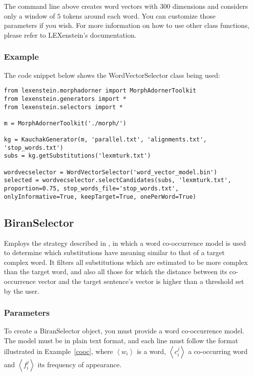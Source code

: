 The command line above creates word vectors with $300$ dimensions and considers only a window of $5$ tokens around each word. You can customize those parameters if you wish. For more information on how to use other class functions, please refer to LEXenstein's documentation.

\subsubsection{Example}

The code snippet below shows the WordVectorSelector class being used:

\begin{lstlisting}
from lexenstein.morphadorner import MorphAdornerToolkit
from lexenstein.generators import *
from lexenstein.selectors import *

m = MorphAdornerToolkit('./morph/')

kg = KauchakGenerator(m, 'parallel.txt', 'alignments.txt', 'stop_words.txt')
subs = kg.getSubstitutions('lexmturk.txt')

wordvecselector = WordVectorSelector('word_vector_model.bin')
selected = wordvecselector.selectCandidates(subs, 'lexmturk.txt', proportion=0.75, stop_words_file='stop_words.txt', onlyInformative=True, keepTarget=True, onePerWord=True)
\end{lstlisting}









\subsection{BiranSelector}

Employs the strategy described in \cite{Biran2011}, in which a word co-occurrence model is used to determine which substitutions have meaning similar to that of a target complex word. It filters all substitutions which are estimated to be more complex than the target word, and also all those for which the distance between its co-occurrence vector and the target sentence's vector is higher than a threshold set by the user.


\subsubsection{Parameters}

To create a BiranSelector object, you must provide a word co-occurrence model. The model must be in plain text format, and each line must follow the format illustrated in Example~\ref{cooc}, where $\left\langle w_{i} \right\rangle$ is a word, $\left\langle c_{i}^{j} \right\rangle$ a co-occurring word and $\left\langle f_{i}^{j} \right\rangle$ its frequency of appearance.

